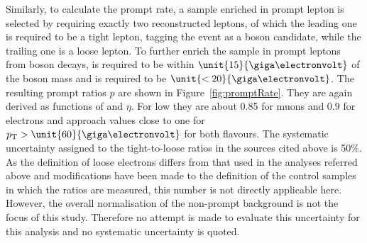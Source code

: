 Similarly, to calculate the prompt rate, a sample enriched in prompt lepton is selected by requiring exactly two reconstructed leptons, of which the leading one is required to be a tight lepton, tagging the event as a \Z boson candidate, while the trailing one is a loose lepton. To further enrich the sample in prompt leptons from \Z boson decays, \mll is required to be within $\unit{15}{\giga\electronvolt}$ of the \Z boson mass and \MET is required to be $\unit{<20}{\giga\electronvolt}$. The resulting prompt ratios $p$ are shown in Figure~\ref{fig:promptRate}. They are again derived as functions of \pt and $\eta$. For low \pt they are about 0.85 for muons and 0.9 for electrons and approach values close to one for $\pt > \unit{60}{\giga\electronvolt}$ for both flavours. The systematic uncertainty assigned to the tight-to-loose ratios in the sources cited above is 50\%. As the definition of loose electrons differs from that used in the analyses referred above and modifications have been made to the definition of the control samples in which the ratios are measured, this number is not directly applicable here. However, the overall normalisation of the non-prompt background is not the focus of this study. Therefore no attempt is made to evaluate this uncertainty for this analysis and no systematic uncertainty is quoted. 

